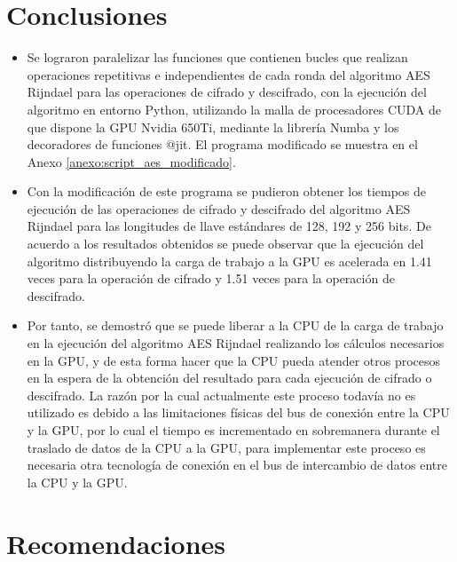 \documentclass[../main/main.tex]{subfiles}
\begin{document}
\espacio

  \section{Conclusiones}

  \begin{itemize}[noitemsep,nolistsep]
    \item Se lograron paralelizar las funciones que contienen bucles que realizan operaciones repetitivas e independientes de cada ronda del algoritmo AES Rijndael para las operaciones de cifrado y descifrado, con la ejecución del algoritmo en entorno Python, utilizando la malla de procesadores CUDA de que dispone la GPU Nvidia 650Ti, mediante la librería Numba y los decoradores de funciones @jit. El programa modificado se muestra en el Anexo \ref{anexo:script_aes_modificado}.
    \item Con la modificación de este programa se pudieron obtener los tiempos de ejecución de las operaciones de cifrado y descifrado del algoritmo AES Rijndael para las longitudes de llave estándares de 128, 192 y 256 bits. De acuerdo a los resultados obtenidos se puede observar que la ejecución del algoritmo distribuyendo la carga de trabajo a la GPU es acelerada en 1.41 veces para la operación de cifrado y 1.51 veces para la operación de descifrado.
    \item Por tanto, se demostró que se puede liberar a la CPU de la carga de trabajo en la ejecución del algoritmo AES Rijndael realizando los cálculos necesarios en la GPU, y de esta forma hacer que la CPU pueda atender otros procesos en la espera de la obtención del resultado para cada ejecución de cifrado o descifrado. La razón por la cual actualmente este proceso todavía no es utilizado es debido a las limitaciones físicas del bus de conexión entre la CPU y la GPU, por lo cual el tiempo es incrementado en sobremanera durante el traslado de datos de la CPU a la GPU, para implementar este proceso es necesaria otra tecnología de conexión en el bus de intercambio de datos entre la CPU y la GPU.
  \end{itemize}

  \section{Recomendaciones}
\end{document}
